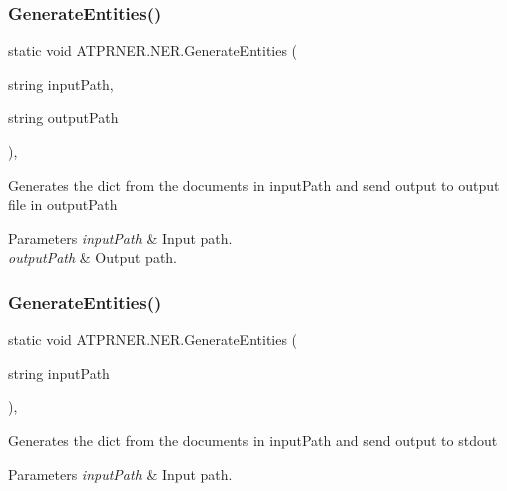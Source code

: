 \subsubsection{\texorpdfstring{Generate\+Entities()}{GenerateEntities()}\hspace{0.1cm}{\footnotesize\ttfamily [1/2]}}
{\footnotesize\ttfamily static void A\+T\+P\+R\+N\+E\+R.\+N\+E\+R.\+Generate\+Entities (\begin{DoxyParamCaption}\item[{string}]{input\+Path,  }\item[{string}]{output\+Path }\end{DoxyParamCaption})\hspace{0.3cm}{\ttfamily [inline]}, {\ttfamily [static]}}



Generates the dict from the documents in input\+Path and send output to output file in output\+Path 


\begin{DoxyParams}{Parameters}
{\em input\+Path} & Input path.\\
\hline
{\em output\+Path} & Output path.\\
\hline
\end{DoxyParams}
\hypertarget{class_a_t_p_r_n_e_r_1_1_n_e_r_afbf080a32a868531adb8c7f4ec5f8035}{}\label{class_a_t_p_r_n_e_r_1_1_n_e_r_afbf080a32a868531adb8c7f4ec5f8035} 
\subsubsection{\texorpdfstring{Generate\+Entities()}{GenerateEntities()}\hspace{0.1cm}{\footnotesize\ttfamily [2/2]}}
{\footnotesize\ttfamily static void A\+T\+P\+R\+N\+E\+R.\+N\+E\+R.\+Generate\+Entities (\begin{DoxyParamCaption}\item[{string}]{input\+Path }\end{DoxyParamCaption})\hspace{0.3cm}{\ttfamily [inline]}, {\ttfamily [static]}}



Generates the dict from the documents in input\+Path and send output to stdout 


\begin{DoxyParams}{Parameters}
{\em input\+Path} & Input path.\\
\hline
\end{DoxyParams}
\hypertarget{class_a_t_p_r_n_e_r_1_1_n_e_r_a8480137d05620d726021a2f4ae818869}{}\label{class_a_t_p_r_n_e_r_1_1_n_e_r_a8480137d05620d726021a2f4ae818869} 
